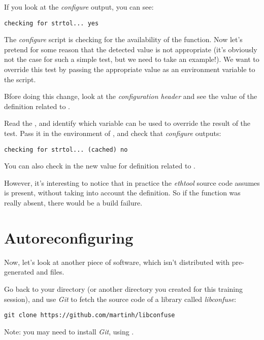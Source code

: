 If you look at the {\em configure} output, you can see:

\begin{verbatim}
checking for strtol... yes
\end{verbatim}

The {\em configure} script is checking for the availability of the
 function. Now let's pretend for some reason that the
detected value is not appropriate (it's obviously not the case for
such a simple test, but we need to take an example!). We want to
override this test by passing the appropriate value as an environment
variable to the  script.

Bfore doing this change, look at the
 {\em configuration header} and see the value of the
definition related to .

Read the , and identify which variable can be used to
override the result of the  test. Pass it in the
environment of , and check that {\em configure}
outputs:

\begin{verbatim}
checking for strtol... (cached) no
\end{verbatim}

You can also check in  the new value for definition
related to .

However, it's interesting to notice that in practice the {\em ethtool}
source code assumes  is present, without taking into
account the  definition. So if the function was
really absent, there would be a build failure.

\section{Autoreconfiguring}

Now, let's look at another piece of software, which isn't distributed
with pre-generated  and  files.

Go back to your  directory (or another directory you
created for this training session), and use {\em Git} to fetch the
source code of a library called {\em libconfuse}:

\begin{verbatim}
git clone https://github.com/martinh/libconfuse
\end{verbatim}

Note: you may need to install {\em Git}, using .

